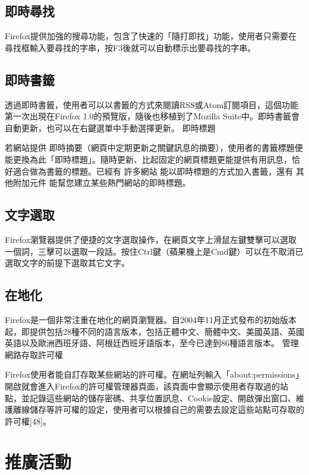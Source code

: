 \documentclass[12pt, a4paper]{article}
\begin{document}
\subsection{即時尋找}

Firefox提供加強的搜尋功能，包含了快速的「隨打即找」功能，使用者只需要在尋找框輸入要尋找的字串，按F3後就可以自動標示出要尋找的字串。
\subsection{即時書籤}

透過即時書籤，使用者可以以書籤的方式來閱讀RSS或Atom訂閱項目，這個功能第一次出現在Firefox 1.0的預覽版，隨後也移植到了Mozilla Suite中。即時書籤會自動更新，也可以在右鍵選單中手動選擇更新。
即時標題

若網站提供 即時摘要（網頁中定期更新之關鍵訊息的摘要），使用者的書籤標題便能更換為此「即時標題」。隨時更新、比起固定的網頁標題更能提供有用訊息，恰好適合做為書籤的標題。已經有 許多網站 能以即時標題的方式加入書籤，還有 其他附加元件 能幫您建立某些熱門網站的即時標題。

\subsection{文字選取}

Firefox瀏覽器提供了便捷的文字選取操作，在網頁文字上滑鼠左鍵雙擊可以選取一個詞，三擊可以選取一段話。按住Ctrl鍵（蘋果機上是Cmd鍵）可以在不取消已選取文字的前提下選取其它文字。

\subsection{在地化}

Firefox是一個非常注重在地化的網頁瀏覽器。自2004年11月正式發布的初始版本起，即提供包括28種不同的語言版本，包括正體中文、簡體中文、美國英語、英國英語以及歐洲西班牙語、阿根廷西班牙語版本，至今已達到86種語言版本。
管理網路存取許可權

Firefox使用者能自訂存取某些網站的許可權。在網址列輸入「about:\allowbreak{}permissions」開啟就會進入Firefox的許可權管理器頁面，該頁面中會顯示使用者存取過的站點，並記錄這些網站的儲存密碼、共享位置訊息、Cookie設定、開啟彈出窗口、維護離線儲存等許可權的設定，使用者可以根據自己的需要去設定這些站點可存取的許可權[48]。

\section{推廣活動}
\end{document}
